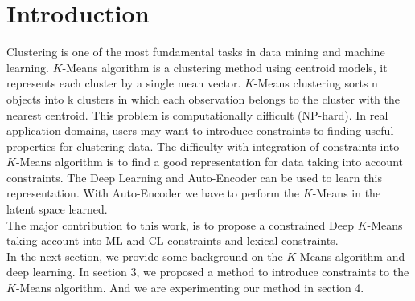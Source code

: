 \section{Introduction}\label{sec:intro}

Clustering is one of the most fundamental tasks in data mining and machine
learning. $K$-Means algorithm is a clustering method using centroid models,
it represents each cluster by a single mean vector. $K$-Means clustering sorts
n objects into k clusters in which each observation belongs to
the cluster with the nearest centroid. This problem is computationally
difficult (NP-hard).
In real application domains, users may want to introduce constraints to finding 
useful properties for clustering data. The difficulty with integration of 
constraints into $K$-Means algorithm is to find a good representation for data 
taking into account constraints. The Deep Learning and Auto-Encoder can be used 
to learn this representation. With Auto-Encoder we have to perform the $K$-Means 
in the latent space learned.
\\The major contribution to this work, is to propose a constrained Deep $K$-Means 
taking account into ML and CL constraints and lexical constraints.
\\In the next section, we provide some background on the $K$-Means algorithm and 
deep learning. In section 3, we proposed a method to introduce constraints to 
the $K$-Means algorithm. And we are experimenting our method in section 4.

